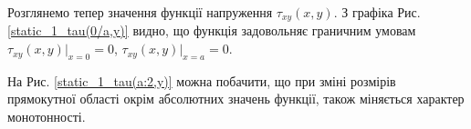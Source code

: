 Розглянемо тепер значення функції напруження $\tau_{xy}(x,y)$. З графіка Рис. \ref{static_1_tau(0/a,y)} видно, що
функція задовольняє граничним умовам $\tau_{xy}(x,y) |_{x=0}=0$, $\tau_{xy}(x,y) |_{x=a}=0$.

На Рис. \ref{static_1_tau(a:2,y)} можна побачити, що при зміні розмірів прямокутної області окрім абсолютних значень функції,
також міняється характер монотонності.






